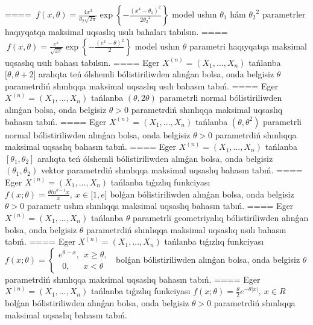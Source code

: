 ====
\(\ f(x,\theta) = \frac{4x^{3}}{\theta_{2}\sqrt{2\pi}}\exp\left\{ - \frac{\left( x^{4} - \theta_{1} \right)^{2}}{2{\theta_{2}}^{2}} \right\}\) model ushın \(\theta_{1}\) hám \({\theta_{2}}^{2}\) parametrler haqıyqatqa maksimal uqsaslıq usılı bahaları tabılsın.
====
\(\ f(x,\theta) = \frac{e^{x}}{\sqrt{2\pi}}\exp\left\{ - \frac{\left( e^{x} - \theta \right)^{2}}{2} \right\}\) model ushın \(\theta\) parametri haqıyqatqa maksimal uqsaslıq usılı bahası tabılsın.
====
Eger \(X^{(n)} = \left( X_{1},...,X_{n} \right)\) tańlanba \(\lbrack\theta,\theta + 2\rbrack\) aralıqta teń ólshemli bólistiriliwden alınǵan bolsa, onda belgisiz \(\theta\) parametrdiń shınlıqqa maksimal uqsaslıq usılı bahasın tabıń.
====
Eger \(X^{(n)} = \left( X_{1},...,X_{n} \right)\) tańlanba \((\theta,2\theta)\) parametrli normal bólistiriliwden alınǵan bolsa, onda belgisiz \(\theta > 0\) parametrdiń shınlıqqa maksimal uqsaslıq bahasın tabıń.
====
Eger \(X^{(n)} = \left( X_{1},...,X_{n} \right)\) tańlanba \(\left( \theta,\theta^{2} \right)\) parametrli normal bólistiriliwden alınǵan bolsa, onda belgisiz \(\theta > 0\) parametrdiń shınlıqqa maksimal uqsaslıq bahasın tabıń.
====
Eger \(X^{(n)} = \left( X_{1},...,X_{n} \right)\) tańlanba \(\left\lbrack \theta_{1},\theta_{2} \right\rbrack\) aralıqta teń ólshemli bólistiriliwden alınǵan bolsa, onda belgisiz \(\left( \theta_{1},\theta_{2} \right)\) vektor parametrdiń shınlıqqa maksimal uqsaslıq bahasın tabıń.
====
Eger \(X^{(n)} = \left( X_{1},...,X_{n} \right)\) tańlanba tıǵızlıq funkciyası
$f(x;\theta) = \frac{\theta ln^{\theta - 1}x}{x},\ x \in \lbrack 1,e\rbrack$
bolǵan bólistiriliwden alınǵan bolsa, onda belgisiz \(\theta > 0\) parametr ushın shınlıqqa maksimal uqsaslıq bahasın tabıń.
====
Eger \(X^{(n)} = \left( X_{1},...,X_{n} \right)\) tańlanba \(\theta\) parametrli geometriyalıq bólistiriliwden alınǵan bolsa, onda belgisiz \(\theta\) parametrdiń shınlıqqa maksimal uqsaslıq usılı bahasın tabıń.
====
Eger \(X^{(n)} = \left( X_{1},...,X_{n} \right)\) tańlanba tıǵızlıq funkciyası
$f(x;\theta) = \left\{ \begin{matrix}
e^{\theta - x},\ \ x \geq \theta, \\
\ \ 0,\ \ \ \ \ \ \ x < \theta
\end{matrix} \right.\ $
bolǵan bólistiriliwden alınǵan bolsa, onda belgisiz \(\theta\) parametrdiń shınlıqqa maksimal uqsaslıq bahasın tabıń.
====
Eger \(X^{(n)} = \left( X_{1},...,X_{n} \right)\) tańlanba tıǵızlıq funkciyası
$f(x;\theta) = \frac{\theta}{2}e^{- \theta|x|},\ x \in R$
bolǵan bólistiriliwden alınǵan bolsa, onda belgisiz \(\theta > 0\) parametrdiń shınlıqqa maksimal uqsaslıq bahasın tabıń.
